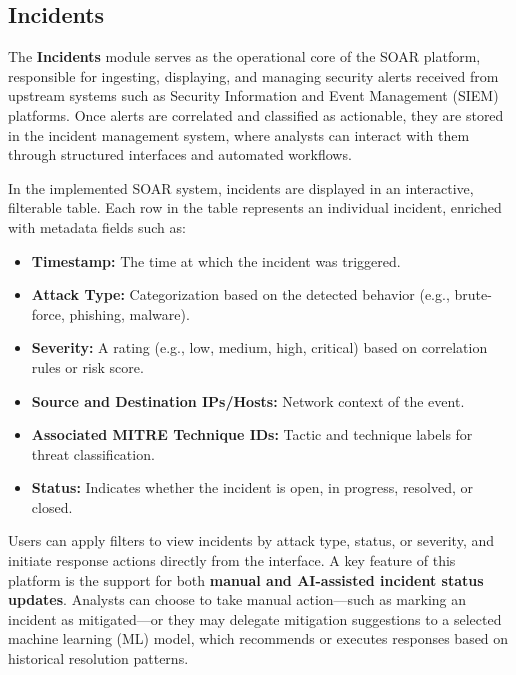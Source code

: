 \subsection{Incidents}

The \textbf{Incidents} module serves as the operational core of the SOAR platform, responsible for ingesting, displaying, and managing security alerts received from upstream systems such as Security Information and Event Management (SIEM) platforms. Once alerts are correlated and classified as actionable, they are stored in the incident management system, where analysts can interact with them through structured interfaces and automated workflows.

In the implemented SOAR system, incidents are displayed in an interactive, filterable table. Each row in the table represents an individual incident, enriched with metadata fields such as:

\begin{itemize}[noitemsep,topsep=0pt]
    \item \textbf{Timestamp:} The time at which the incident was triggered.
    \item \textbf{Attack Type:} Categorization based on the detected behavior (e.g., brute-force, phishing, malware).
    \item \textbf{Severity:} A rating (e.g., low, medium, high, critical) based on correlation rules or risk score.
    \item \textbf{Source and Destination IPs/Hosts:} Network context of the event.
    \item \textbf{Associated MITRE Technique IDs:} Tactic and technique labels for threat classification.
    \item \textbf{Status:} Indicates whether the incident is open, in progress, resolved, or closed.
\end{itemize}

Users can apply filters to view incidents by attack type, status, or severity, and initiate response actions directly from the interface. A key feature of this platform is the support for both \textbf{manual and AI-assisted incident status updates}. Analysts can choose to take manual action—such as marking an incident as mitigated—or they may delegate mitigation suggestions to a selected machine learning (ML) model, which recommends or executes responses based on historical resolution patterns.


